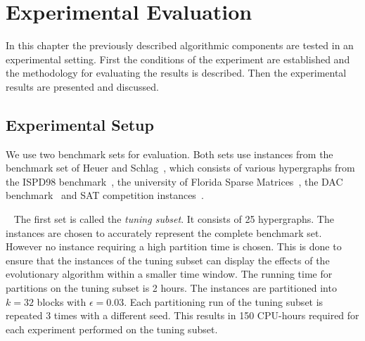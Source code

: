 \documentclass[a4paper,12pt,titlepage, BCOR7mm,headsepline]{scrbook}
\numberwithin{equation}{section}
\begin{document}
\chapter{Experimental Evaluation}
\label{chapter:experimentalevaluation}
In this chapter the previously described algorithmic components are tested in an experimental setting. First the conditions of the experiment are established and the methodology for evaluating the results is described. Then the experimental results are presented and discussed. 



\section{Experimental Setup}
\label{sec:experimental_setup}
We use two benchmark sets for evaluation. Both sets use instances from the benchmark set of Heuer and Schlag~\cite{heuer2017improving}, which consists of various hypergraphs from the ISPD98 benchmark~\cite{alpert1998ispd98}, the university of Florida Sparse Matrices~\cite{davis2011university}, the DAC benchmark~\cite{viswanathan2012dac} and SAT competition instances~\cite{belov2014proceedings}. 



\newline ~\newline
The first set is called the \emph{tuning subset}. It consists of 25 hypergraphs. The instances are chosen to accurately represent the complete benchmark set. However no instance requiring a high partition time is chosen. This is done to ensure that the instances of the tuning subset can display the effects of the evolutionary algorithm within a smaller time window. The running time for partitions on the tuning subset is 2 hours. The instances are partitioned into $k = 32$ blocks with $\epsilon = 0.03$. Each partitioning run of the tuning subset is repeated 3 times with a different seed. This results in 150 CPU-hours required for each experiment performed on the tuning subset.
\newline
\end{document}
